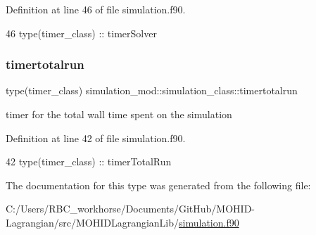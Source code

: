 Definition at line 46 of file simulation.\+f90.


\begin{DoxyCode}
46         \textcolor{keywordtype}{type}(timer\_class) :: timerSolver
\end{DoxyCode}
\mbox{\label{structsimulation__mod_1_1simulation__class_aff028c1a3b421c73038e43b860f45de1}} 
\subsubsection{\texorpdfstring{timertotalrun}{timertotalrun}}
{\footnotesize\ttfamily type(timer\+\_\+class) simulation\+\_\+mod\+::simulation\+\_\+class\+::timertotalrun\hspace{0.3cm}{\ttfamily [private]}}



timer for the total wall time spent on the simulation 



Definition at line 42 of file simulation.\+f90.


\begin{DoxyCode}
42         \textcolor{keywordtype}{type}(timer\_class) :: timerTotalRun
\end{DoxyCode}


The documentation for this type was generated from the following file\+:\begin{DoxyCompactItemize}
\item 
C\+:/\+Users/\+R\+B\+C\+\_\+workhorse/\+Documents/\+Git\+Hub/\+M\+O\+H\+I\+D-\/\+Lagrangian/src/\+M\+O\+H\+I\+D\+Lagrangian\+Lib/\mbox{\hyperlink{simulation_8f90}{simulation.\+f90}}\end{DoxyCompactItemize}
